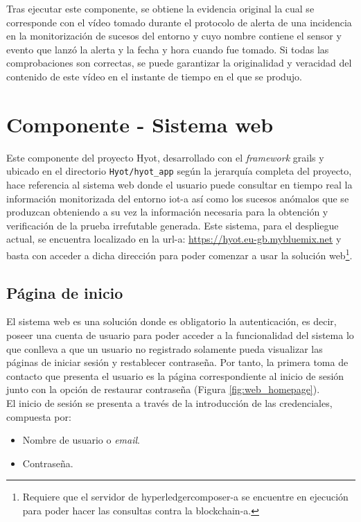 \documentclass[12pt,a4paper, twoside]{report}
\begin{document}
	Tras ejecutar este componente, se obtiene la evidencia original la cual se corresponde con el vídeo tomado durante el protocolo de alerta de una incidencia en la monitorización de sucesos del entorno y cuyo nombre contiene el sensor y evento que lanzó la alerta y la fecha y hora cuando fue tomado. Si todas las comprobaciones son correctas, se puede garantizar la originalidad y veracidad del contenido de este vídeo en el instante de tiempo en el que se produjo.
			
	\section{Componente - Sistema web}
	 	 
	 Este componente del proyecto Hyot, desarrollado con el \textit{\gls{framework}} \gls{grails} y ubicado en el directorio \texttt{Hyot/hyot\_app} según la jerarquía completa del proyecto, hace referencia al sistema web donde el usuario puede consultar en tiempo real la información monitorizada del entorno \gls{iot-a} así como los sucesos anómalos que se produzcan obteniendo a su vez la información necesaria para la obtención y verificación de la prueba irrefutable generada. Este sistema, para el despliegue actual, se encuentra localizado en la \gls{url-a}: \url{https://hyot.eu-gb.mybluemix.net} y basta con acceder a dicha dirección para poder comenzar a usar la solución web\footnote{Requiere que el servidor de \gls{hyperledgercomposer-a} se encuentre en ejecución para poder hacer las consultas contra la \gls{blockchain-a}.}.
			
	\subsection{Página de inicio}
	
	El sistema web es una solución donde es obligatorio la autenticación, es decir, poseer una cuenta de usuario para poder acceder a la funcionalidad del sistema lo que conlleva a que un usuario no registrado solamente pueda visualizar las páginas de iniciar sesión y restablecer contraseña. Por tanto, la primera toma de contacto que presenta el usuario es la página correspondiente al inicio de sesión junto con la opción de restaurar contraseña (Figura \ref{fig:web_homepage}). \\
		
	El inicio de sesión se presenta a través de la introducción de las credenciales, compuesta por:
	
	\begin{itemize}
		\item Nombre de usuario o \textit{email}.
		\item Contraseña.
	\end{itemize}
	
\end{document}
